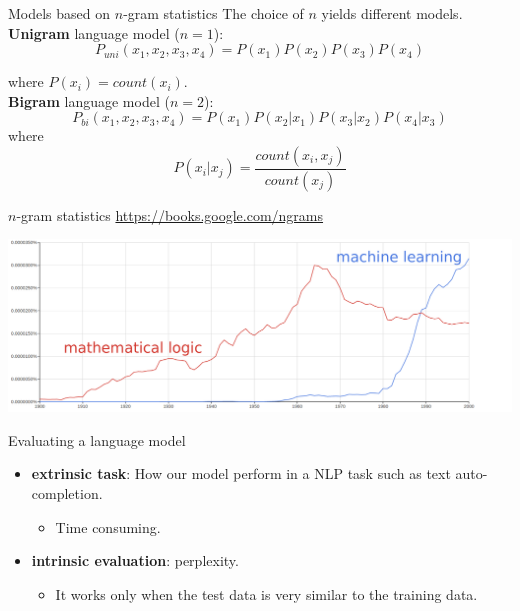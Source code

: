 \documentclass[10pt]{beamer}
\begin{document}
\begin{frame}{Models based on $n$-gram statistics}
The choice of $n$ yields different models.\\

\textbf{Unigram} language model ($n=1$): 
\begin{equation*}
P_{uni}(x_1, x_2, x_3, x_4) = P(x_1)P(x_2)P(x_3)P(x_4)
\end{equation*}

where $P(x_i) = count(x_i)$.\\

\textbf{Bigram} language model ($n=2$): 
\begin{equation*}
P_{bi}(x_1,x_2,x_3,x_4) = P(x_1)P(x_2\vert x_1)P(x_3\vert x_2)P(x_4\vert x_3)
\end{equation*}	
where
\[
P(x_i\vert x_j) = \frac{count(x_i, x_j)}{count(x_j)}
\]
\end{frame}

\begin{frame}{$n$-gram statistics}
\url{https://books.google.com/ngrams}
\vspace{0.4cm}

\includegraphics[scale=0.17]{images/mlXml.png}
\end{frame}



\begin{frame}{Evaluating a language model}

\begin{itemize}
\item \textbf{extrinsic task}: How our model perform in a NLP task such as text auto-completion.
\begin{itemize}
\item Time consuming.
\end{itemize}
\vspace{0.5cm}
\item \textbf{intrinsic evaluation}: perplexity.
\begin{itemize}
\item It works only when the test data is very similar to the training data.
\end{itemize}
\end{itemize}
\end{frame}
\end{document}
